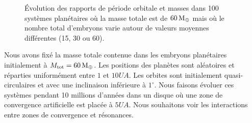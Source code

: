 \begin{figure}[htbp]
\centering
{}\hfill
{}

\hfill
{}

\caption[Effet du nombre d'embryons initial sur les propriétés statistiques des systèmes formés.]{Évolution des rapports de
période orbitale et masses dans 100 systèmes planétaires où la masse totale est de $60\mathrm{\thinspace M_\oplus}$ mais où le nombre total
d'embryons varie autour de valeurs moyennes différentes (15, 30 ou 60). }\label{fig:number_effect}
\end{figure}

Nous avons fixé la masse totale contenue dans les embryons planétaires initialement à $M_\text{tot}=60\mathrm{\thinspace M_\oplus}$. Les positions des planètes sont aléatoires et réparties uniformément entre $1$ et $10\unit{UA}$. Les orbites sont initialement quasi-circulaires et avec une inclinaison inférieure à $1^\circ$. Nous faisons évoluer ces systèmes pendant 10 millions d'années dans un disque où une zone de convergence artificielle est placée à $5\unit{UA}$. Nous souhaitons voir les interactions entre zones de convergence et résonances. 

